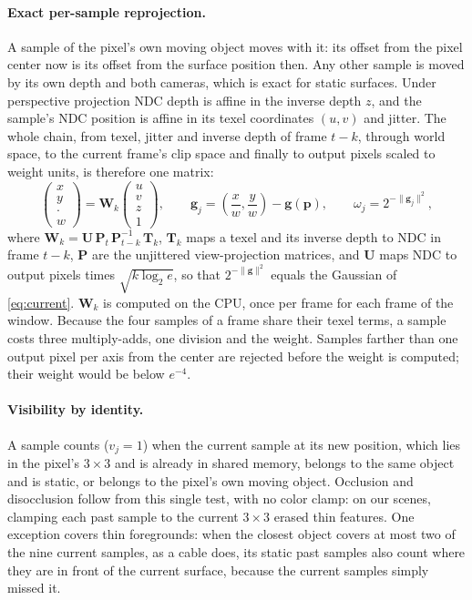 \documentclass[11pt,a4paper]{article}
\newcommand{\vect}[1]{\mathbf{#1}}
\begin{document}
\paragraph{Exact per-sample reprojection.} A sample of the pixel's own moving object moves with it: its offset from the pixel center now is its offset from the surface position then. Any other sample is moved by its own depth and both cameras, which is exact for static surfaces. Under perspective projection NDC depth is affine in the inverse depth $z$, and the sample's NDC position is affine in its texel coordinates $(u,v)$ and jitter. The whole chain, from texel, jitter and inverse depth of frame $t-k$, through world space, to the current frame's clip space and finally to output pixels scaled to weight units, is therefore one matrix:
\begin{equation}
\begin{pmatrix} x\\ y\\ \cdot\\ w \end{pmatrix} = \mathbf{W}_k \begin{pmatrix} u\\ v\\ z\\ 1 \end{pmatrix},
\qquad \vect g_j = \left(\frac{x}{w}, \frac{y}{w}\right) - \vect g(\vect p), \qquad \omega_j = 2^{-\|\vect g_j\|^2},
\label{eq:reproject}
\end{equation}
where $\mathbf{W}_k = \mathbf{U}\,\mathbf{P}_t\,\mathbf{P}_{t-k}^{-1}\,\mathbf{T}_k$, $\mathbf{T}_k$ maps a texel and its inverse depth to NDC in frame $t-k$, $\mathbf{P}$ are the unjittered view-projection matrices, and $\mathbf{U}$ maps NDC to output pixels times $\sqrt{k\log_2 e}$, so that $2^{-\|\vect g\|^2}$ equals the Gaussian of \cref{eq:current}. $\mathbf{W}_k$ is computed on the CPU, once per frame for each frame of the window. Because the four samples of a frame share their texel terms, a sample costs three multiply-adds, one division and the weight. Samples farther than one output pixel per axis from the center are rejected before the weight is computed; their weight would be below $e^{-4}$.

\paragraph{Visibility by identity.} A sample counts ($v_j=1$) when the current sample at its new position, which lies in the pixel's $3\times3$ and is already in shared memory, belongs to the same object and is static, or belongs to the pixel's own moving object. Occlusion and disocclusion follow from this single test, with no color clamp: on our scenes, clamping each past sample to the current $3\times3$ erased thin features. One exception covers thin foregrounds: when the closest object covers at most two of the nine current samples, as a cable does, its static past samples also count where they are in front of the current surface, because the current samples simply missed it.
\end{document}
